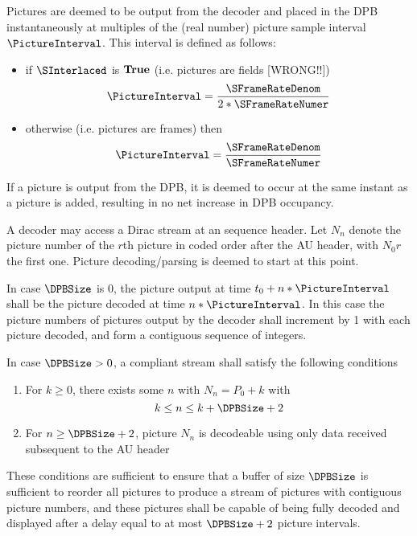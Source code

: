 Pictures are deemed to be output from the decoder and placed in the DPB instantaneously at multiples
of the (real number) picture sample interval $\PictureInterval$. This interval is defined as follows:
\begin{itemize}
\item if $\SInterlaced$ is $\text{\bf{True}}$ (i.e. pictures are fields [WRONG!!])
\begin{equation*}
\PictureInterval=\dfrac{\SFrameRateDenom}{2*\SFrameRateNumer}
\end{equation*}
\item otherwise (i.e. pictures are frames) then 
\begin{equation*}
\PictureInterval=\dfrac{\SFrameRateDenom}{\SFrameRateNumer}
\end{equation*}
\end{itemize}

If a picture is output from the DPB, it is deemed to occur at the same instant as a picture is
added, resulting in no net increase in DPB occupancy.

A decoder may access a Dirac stream at an sequence header. Let $N_n$ denote
the picture number of the $r$th picture in coded order after
the AU header, with $N_0r$ the first one. Picture decoding/parsing 
is deemed to start at this point. 

In case $\DPBSize$ is 0, the picture output at time $t_0+n*\PictureInterval$
shall be the picture decoded at time $n*\PictureInterval$. In this case
the picture numbers of pictures output by the decoder shall increment
by 1 with each picture decoded, and form a contiguous sequence of integers.

In case $\DPBSize>0$, a compliant stream shall satisfy the following
conditions
\begin{enumerate}
\item For $k\geq 0$, there exists some $n$ with $N_n=P_0+k$ with
\[k\leq n\leq k+\DPBSize+2\]
\item For $n\geq\DPBSize+2$, picture $N_n$ is decodeable 
using only data received subsequent to the AU header
\end{enumerate}

These conditions are sufficient to ensure that a buffer of size $\DPBSize$
is sufficient to reorder all pictures to produce a stream of pictures
with contiguous picture numbers, and these pictures shall be capable of being fully 
decoded and displayed after a delay equal to at most $\DPBSize+2$ picture intervals.

